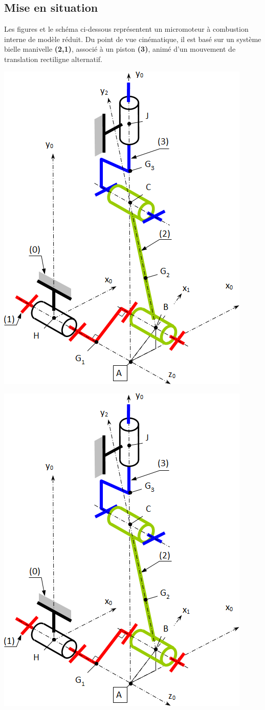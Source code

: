 \def\columnseprulecolor{\color{ocre}}
\setlength{\columnseprule}{0.4pt} 


\setcounter{exo}{0}


\ifprof
\else
\begin{multicols}{2}
\fi

\subsection*{Mise en situation}
Les figures et le schéma ci-dessous représentent un micromoteur à combustion interne de modèle réduit. Du point de vue cinématique, il est basé sur un système bielle manivelle \textbf{(2,1)}, associé à un piston \textbf{(3)}, animé d’un mouvement de translation rectiligne alternatif. 
\ifprof
\begin{center}
\includegraphics[width=.4\linewidth]{images/fig_02}
\end{center}
\else
\begin{center}
\includegraphics[width=.8\linewidth]{images/fig_02}

\end{center}
\end{multicols}
